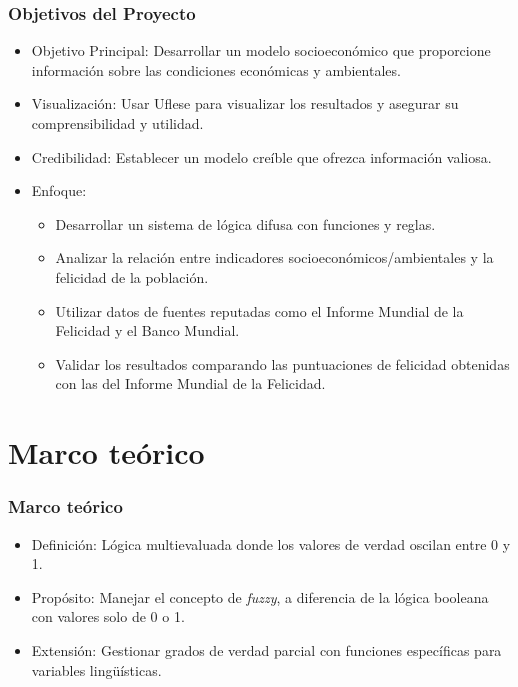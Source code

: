 \documentclass{beamer}
\newcommand{\slideauthor}[1]{\gdef\insertslideauthor{#1}}
\begin{document}
\begin{frame}
\frametitle{Objetivos del Proyecto}
\slideauthor{Diego Fogued}
\begin{itemize}
    \item Objetivo Principal: Desarrollar un modelo socioeconómico que proporcione información sobre las condiciones económicas y ambientales.
    \item Visualización: Usar Uflese para visualizar los resultados y asegurar su comprensibilidad y utilidad.
    \item Credibilidad: Establecer un modelo creíble que ofrezca información valiosa.
    \item Enfoque:
    \begin{itemize}
        \item Desarrollar un sistema de lógica difusa con funciones y reglas.
        \item Analizar la relación entre indicadores socioeconómicos/ambientales y la felicidad de la población.
        \item Utilizar datos de fuentes reputadas como el Informe Mundial de la Felicidad y el Banco Mundial.
        \item Validar los resultados comparando las puntuaciones de felicidad obtenidas con las del Informe Mundial de la Felicidad.
    \end{itemize}
\end{itemize}

\end{frame}

\section{Marco teórico}
\begin{frame}
\frametitle{Marco teórico}
\slideauthor{Diego Fogued}
\begin{itemize}
    \item Definición: Lógica multievaluada donde los valores de verdad oscilan entre 0 y 1.
    \item Propósito: Manejar el concepto de \textit{fuzzy}, a diferencia de la lógica booleana con valores solo de 0 o 1.
    \item Extensión: Gestionar grados de verdad parcial con funciones específicas para variables lingüísticas.
\end{itemize}

\end{frame}
\end{document}
